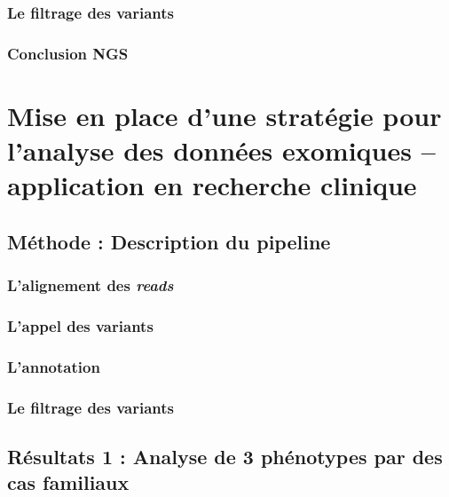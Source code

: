 \documentclass[12pt,twoside]{ugathesis}
\begin{document}
\subsection{Le filtrage des variants}\label{le-filtrage-des-variants}

\subsection{Conclusion NGS}\label{conclusion-ngs}

\chapter{Mise en place d'une stratégie pour l'analyse des données
exomiques -- application en recherche
clinique}\label{mise-en-place-dune-strategie-pour-lanalyse-des-donnees-exomiques-application-en-recherche-clinique}

\section{Méthode : Description du
pipeline}\label{methode-description-du-pipeline}

\subsection{\texorpdfstring{L'alignement des
\emph{reads}}{L'alignement des reads}}\label{lalignement-des-reads}

\subsection{L'appel des variants}\label{lappel-des-variants}

\subsection{L'annotation}\label{lannotation}

\subsection{Le filtrage des variants}\label{le-filtrage-des-variants-1}

\section{Résultats 1 : Analyse de 3 phénotypes par des cas
familiaux}\label{resultats-1-analyse-de-3-phenotypes-par-des-cas-familiaux}
\end{document}
